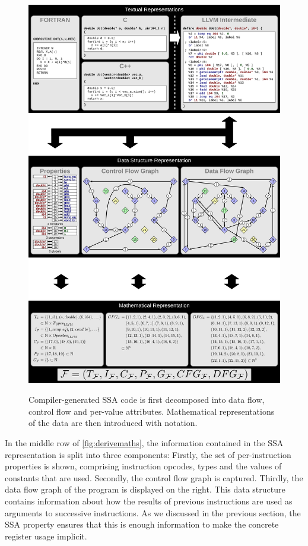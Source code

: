 \begin{figure}[p]
\centering
\includegraphics[width=\textwidth,height=1.5\textwidth]{figures/ssamathmodel.pdf}\\[9.3319pt]
\caption{Compiler-generated SSA code is first decomposed into data flow, control
         flow and per-value attributes.
         Mathematical representations of the data are then introduced with
         notation.}
\label{fig:derivemaths}
\end{figure}

    In the middle row of \autoref{fig:derivemaths}, the information contained in
    the SSA representation is split into three components:
    Firstly, the set of per-instruction properties is shown, comprising
    instruction opcodes, types and the values of constants that are used.
    Secondly, the control flow graph is captured.
    Thirdly, the data flow graph of the program is displayed on the right.
    This data structure contains information about how the results of previous
    instructions are used as arguments to successive instructions.
    As we discussed in the previous section, the SSA property ensures that this
    is enough information to make the concrete register usage implicit.

